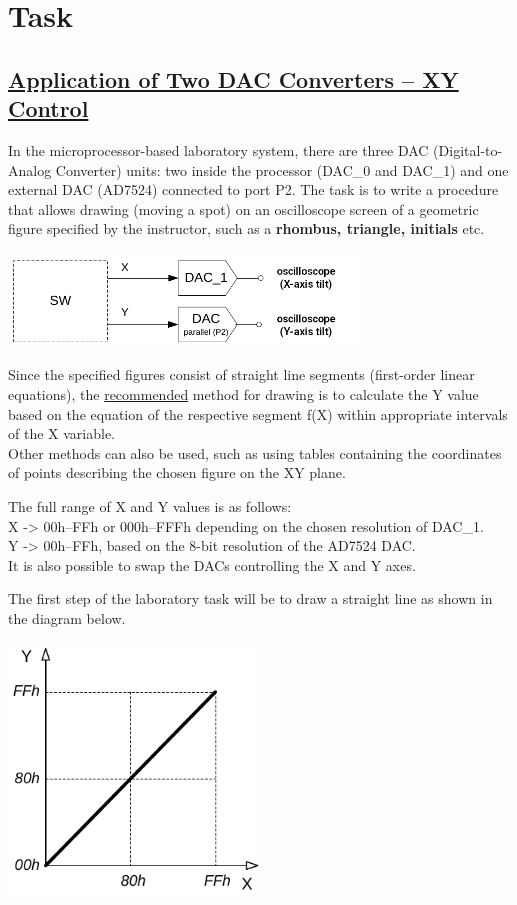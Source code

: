 \documentclass{article}
\begin{document}
\section*{Task}
\subsection*{\underline{Application of Two DAC Converters – XY Control}}
In the microprocessor-based laboratory system, there are three DAC (Digital-to-Analog Converter) units: two inside the processor (DAC\_0 and DAC\_1) and one external DAC (AD7524) connected to port P2. The task is to write a procedure that allows drawing (moving a spot) on an oscilloscope screen of a geometric figure specified by the instructor, such as a \textbf{rhombus, triangle, initials} etc.
\begin{center}
\includegraphics[width=0.7\textwidth]{"../img/DACs_XY_1.png"}
\end{center}
Since the specified figures consist of straight line segments (first-order linear equations), the \underline{recommended} method for drawing is to calculate the Y value based on the equation of the respective segment f(X) within appropriate intervals of the X variable. \\
Other methods can also be used, such as using tables containing the coordinates of points describing the chosen figure on the XY plane.
\vspace{5mm}

The full range of X and Y values is as follows: \\
X -> 00h–FFh or 000h–FFFh depending on the chosen resolution of DAC\_1. \\
Y -> 00h–FFh, based on the 8-bit resolution of the AD7524 DAC. \\
It is also possible to swap the DACs controlling the X and Y axes.
\vspace{5mm}

The first step of the laboratory task will be to draw a straight line as shown in the diagram below.
\begin{center}
\includegraphics[width=0.5\textwidth]{"../img/DACs_XY_2.png"}
\end{center}
\end{document}
